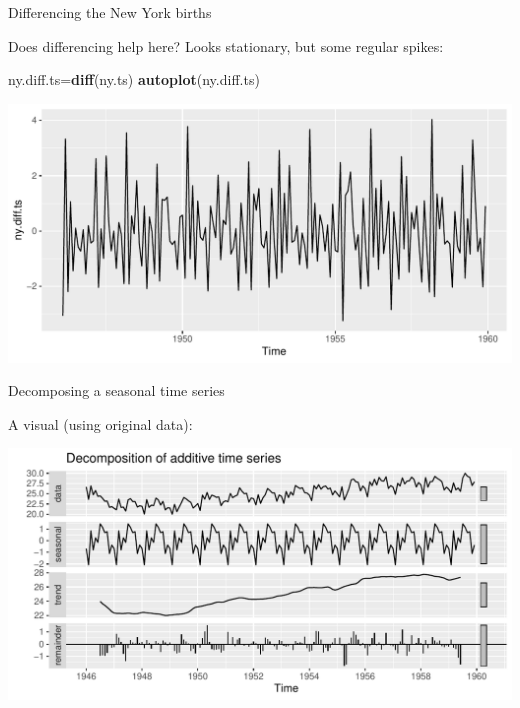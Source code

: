 \documentclass[ignorenonframetext,]{beamer}
\newenvironment{Shaded}{\begin{snugshade}}{\end{snugshade}}
\newcommand{\KeywordTok}[1]{\textcolor[rgb]{0.13,0.29,0.53}{\textbf{#1}}}
\newcommand{\NormalTok}[1]{#1}
\newcommand{\OperatorTok}[1]{\textcolor[rgb]{0.81,0.36,0.00}{\textbf{#1}}}
\newcommand{\StringTok}[1]{\textcolor[rgb]{0.31,0.60,0.02}{#1}}
\begin{document}
\begin{frame}[fragile]{Differencing the New York births}
\protect\hypertarget{differencing-the-new-york-births}{}

Does differencing help here? Looks stationary, but some regular spikes:

\begin{Shaded}
\begin{Highlighting}[]
\NormalTok{ny.diff.ts=}\KeywordTok{diff}\NormalTok{(ny.ts)}
\KeywordTok{autoplot}\NormalTok{(ny.diff.ts)}
\end{Highlighting}
\end{Shaded}

\includegraphics{figure/unnamed-chunk-574-1.pdf}

\end{frame}

\begin{frame}[fragile]{Decomposing a seasonal time series}
\protect\hypertarget{decomposing-a-seasonal-time-series}{}

A visual (using original data):

\begin{Shaded}
\end{Shaded}

\includegraphics{figure/unnamed-chunk-575-1.pdf}

\end{frame}
\end{document}
